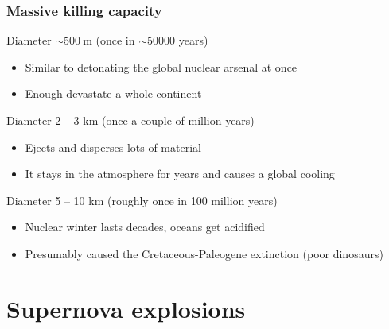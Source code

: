 \documentclass{beamer}
\begin{document}
\begin{frame}
\frametitle{Massive killing capacity}

\begin{block}{Diameter $\sim 500 \: \mathrm{m}$ (once in $\sim 50000$ years)}
\begin{itemize}
\item Similar to detonating the global nuclear arsenal at once
\item Enough devastate a whole continent
\end{itemize}
\end{block}

\begin{block}{Diameter 2 -- 3 km (once a couple of million years)}
\begin{itemize}
\item Ejects and disperses lots of material
\item It stays in the atmosphere for years and causes a global cooling
\end{itemize}
\end{block}

\begin{block}{Diameter 5 -- 10 km (roughly once in 100 million years)}
\begin{itemize}
\item Nuclear winter lasts decades, oceans get acidified
\item Presumably caused the Cretaceous-Paleogene extinction (poor dinosaurs)
\end{itemize}
\end{block}
\end{frame}

\section{Supernova explosions}
\end{document}
